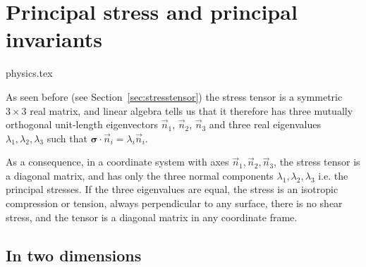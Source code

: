 \newpage
\section{Principal stress and principal invariants} \label{sec:princ_stress}
\begin{flushright} {\tiny {\color{gray} physics.tex}} \end{flushright}


As seen before (see Section~\ref{sec:stresstensor}) 
the stress tensor is a symmetric $3\times3$ real matrix, and linear algebra tells us that it 
therefore has three mutually orthogonal unit-length eigenvectors $\vec{n}_{1}$, $\vec{n}_{2}$, 
$\vec{n}_{3}$ and three real eigenvalues $\lambda _{1},\lambda _{2},\lambda _{3}$ 
such that ${\bm \sigma}\!\cdot\! \vec{n}_i=\lambda_{i} \vec{n}_{i}$.

As a consequence, in a coordinate system with axes $\vec{n}_{1},\vec{n}_{2},\vec{n}_{3}$, 
the stress tensor is a diagonal matrix, and has only the three normal components $\lambda _{1},\lambda _{2},\lambda _{3}$
i.e. the principal stresses. If the three eigenvalues are equal, the stress is an isotropic compression or tension, always perpendicular to any surface, there is no shear stress, and the tensor is a diagonal matrix in any coordinate frame.

\subsection{In two dimensions}

